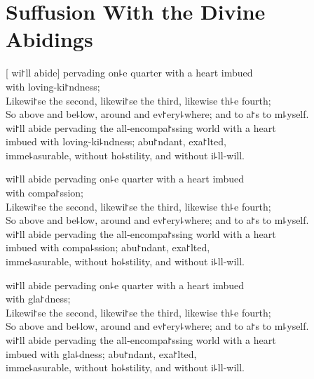 \chapter[Divine Abidings]{Suffusion With the Divine Abidings}%


\begin{leader}
\end{leader}

[ wi꜓ll abide] pervading on꜕e quarter with a heart imbued\\
\vin with loving-ki꜓ndness;\\
Likewi꜓se the second, likewi꜓se the third, likewise th꜕e fourth;\\
So above and be꜕low, around and ev꜓ery꜕where; and to  a꜓s to m꜕yself.\\
 wi꜓ll abide pervading the all-encompa꜓ssing world with a heart \\
\vin imbued with loving-ki꜕ndness; abu꜓ndant, exa꜓lted,\\
\vin imme꜕asurable, without ho꜕stility, and without i꜕ll-will.

 wi꜓ll abide pervading on꜕e quarter with a heart imbued\\
\vin with compa꜓ssion;\\
Likewi꜓se the second, likewi꜓se the third, likewise th꜕e fourth;\\
So above and be꜕low, around and ev꜓ery꜕where; and to  a꜓s to m꜕yself.\\
 wi꜓ll abide pervading the all-encompa꜓ssing world with a heart \\
\vin imbued with compa꜕ssion; abu꜓ndant, exa꜓lted,\\
\vin imme꜕asurable, without ho꜕stility, and without i꜕ll-will.

 wi꜓ll abide pervading on꜕e quarter with a heart imbued\\
\vin with gla꜓dness;\\
Likewi꜓se the second, likewi꜓se the third, likewise th꜕e fourth;\\
So above and be꜕low, around and ev꜓ery꜕where; and to  a꜓s to m꜕yself.\\
 wi꜓ll abide pervading the all-encompa꜓ssing world with a heart \\
\vin imbued with gla꜕dness; abu꜓ndant, exa꜓lted,\\
\vin imme꜕asurable, without ho꜕stility, and without i꜕ll-will.

